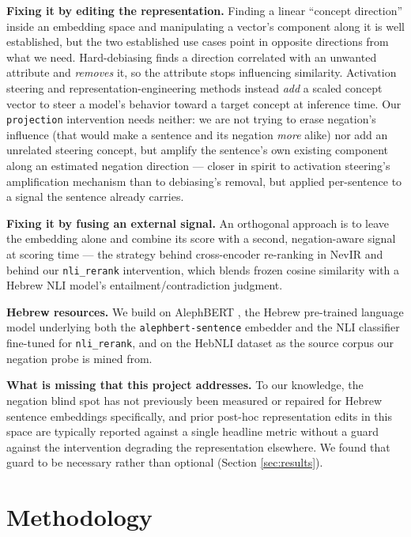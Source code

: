 \documentclass{article}
\begin{document}
\textbf{Fixing it by editing the representation.} Finding a linear
``concept direction'' inside an embedding space and manipulating a
vector's component along it is well established, but the two established
use cases point in opposite directions from what we need. Hard-debiasing
\citep{bolukbasi2016debiasing} finds a direction correlated with an
unwanted attribute and \emph{removes} it, so the attribute stops
influencing similarity. Activation steering and representation-engineering
methods \citep{turner2023activation,zou2023representation} instead
\emph{add} a scaled concept vector to steer a model's behavior toward a
target concept at inference time. Our \texttt{projection} intervention
needs neither: we are not trying to erase negation's influence (that would
make a sentence and its negation \emph{more} alike) nor add an unrelated
steering concept, but amplify the sentence's own existing component along
an estimated negation direction --- closer in spirit to activation
steering's amplification mechanism than to debiasing's removal, but
applied per-sentence to a signal the sentence already carries.

\textbf{Fixing it by fusing an external signal.} An orthogonal approach is
to leave the embedding alone and combine its score with a second,
negation-aware signal at scoring time --- the strategy behind
cross-encoder re-ranking in NevIR and behind our \texttt{nli\_rerank}
intervention, which blends frozen cosine similarity with a Hebrew NLI
model's entailment/contradiction judgment.

\textbf{Hebrew resources.} We build on AlephBERT \citep{seker2022alephbert},
the Hebrew pre-trained language model underlying both the
\texttt{alephbert-sentence} embedder and the NLI classifier fine-tuned for
\texttt{nli\_rerank}, and on the HebNLI dataset \citep{hebnli} as the
source corpus our negation probe is mined from.

\textbf{What is missing that this project addresses.} To our knowledge, the
negation blind spot has not previously been measured or repaired for
Hebrew sentence embeddings specifically, and prior post-hoc representation
edits in this space are typically reported against a single headline
metric without a guard against the intervention degrading the
representation elsewhere. We found that guard to be necessary rather than
optional (Section \ref{sec:results}).

\section{Methodology}
\end{document}
